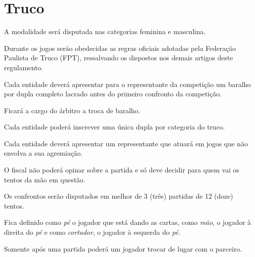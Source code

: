 {\let\clearpage\relax \chapter{Truco}}

\begin{article}
	A modalidade será disputada nas categorias feminina e masculina.
\end{article}

\begin{article}
	Durante os jogos serão obedecidas as regras oficiais adotadas pela Federação Paulista de Truco (FPT), ressalvando os dispostos nos demais artigos deste regulamento.
\end{article}

\begin{article}
	Cada entidade deverá apresentar para o representante da competição um baralho por dupla completo lacrado antes do primeiro confronto da competição.

	\begin{xparagraph}
		Ficará a cargo do árbitro a troca de baralho.
	\end{xparagraph}
\end{article}

\begin{article}
	Cada entidade poderá inscrever uma única dupla por categoria do truco.
\end{article}

\begin{article}
	Cada entidade deverá apresentar um representante que atuará em jogos que não envolva a sua agremiação.

	\begin{xparagraph}
		O fiscal não poderá opinar sobre a partida e só deve decidir para quem vai os tentos da mão em questão.
	\end{xparagraph}
\end{article}

\begin{article}
	Os confrontos serão disputados em melhor de 3 (três) partidas de 12 (doze) tentos.
\end{article}

\begin{article}
	Fica definido como \textit{pé} o jogador que está dando as cartas, como \textit{mão}, o jogador à direita do \textit{pé} e como \textit{cortador}, o jogador à esquerda do \textit{pé}.

	\begin{xparagraph}
		Somente após uma partida poderá um jogador trocar de lugar com o parceiro.
	\end{xparagraph}
\end{article}

